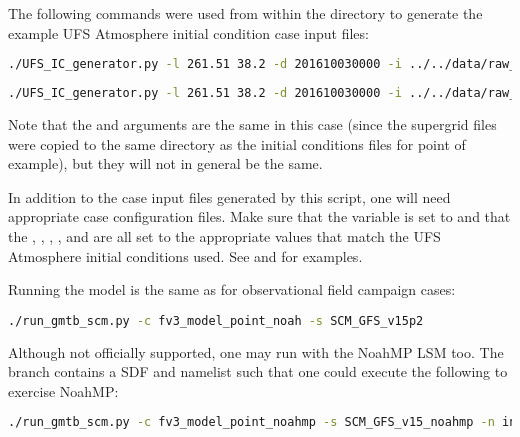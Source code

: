 The following commands were used from within the  directory to generate the example UFS Atmosphere initial condition case input files:
\begin{lstlisting}[language=bash]
./UFS_IC_generator.py -l 261.51 38.2 -d 201610030000 -i ../../data/raw_case_input/FV3_C96_example_ICs -g ../../data/raw_case_input/FV3_C96_example_ICs -n fv3_model_point_noah
\end{lstlisting}

\begin{lstlisting}[language=bash]
./UFS_IC_generator.py -l 261.51 38.2 -d 201610030000 -i ../../data/raw_case_input/FV3_C96_example_ICs -g ../../data/raw_case_input/FV3_C96_example_ICs -n fv3_model_point_noahmp -mp
\end{lstlisting}

Note that the  and  arguments are the same in this case (since the supergrid files were copied to the same directory as the initial conditions files for point of example), but they will not in general be the same.

In addition to the case input files generated by this script, one will need appropriate case configuration files. Make sure that the  variable is set to  and that the , , , , and  are all set to the appropriate values that match the UFS Atmosphere initial conditions used. See  and  for examples.

Running the model is the same as for observational field campaign cases:
\begin{lstlisting}[language=bash]
./run_gmtb_scm.py -c fv3_model_point_noah -s SCM_GFS_v15p2
\end{lstlisting}

Although not officially supported, one may run with the NoahMP LSM too. The  branch contains a SDF and namelist such that one could execute the following to exercise NoahMP:
\begin{lstlisting}[language=bash]
./run_gmtb_scm.py -c fv3_model_point_noahmp -s SCM_GFS_v15_noahmp -n input_GFS_v15_noahmp.nml
\end{lstlisting}
